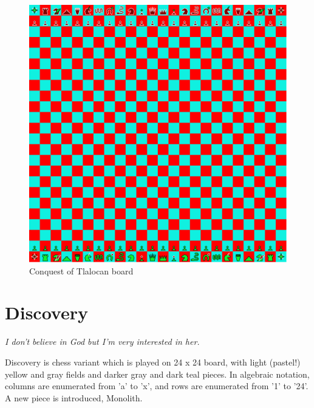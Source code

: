 \documentclass[a5paper,12pt,draft]{book} %
\begin{document}
\noindent
\begin{figure}[h]
\includegraphics[width=1.0\textwidth, keepaspectratio=true]{../gfx/boards/18_conquest_of_tlalocan.png}
\caption{Conquest of Tlalocan board}
\label{fig:conquest_of_tlalocan}
\end{figure}

\clearpage

\chapter*{Discovery}

\begin{flushright}
\parbox{0.8\textwidth}{
\emph{I don’t believe in God but I’m very interested in her. \\
 } }
\end{flushright}

Discovery is chess variant which is played on 24 x 24 board, with
light (pastel!) yellow and gray fields and darker gray and dark teal
pieces. In algebraic notation, columns are enumerated from 'a' to 'x',
and rows are enumerated from '1' to '24'. A new piece is introduced,
Monolith.
\end{document}
